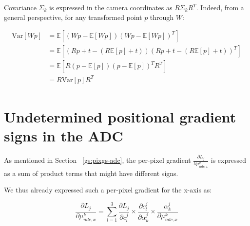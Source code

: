 Covariance $\Sigma_{k}$ is expressed in the camera coordinates as $R\Sigma_{k}R^{T}$. Indeed, from a general perspective, for any transformed point $p$ through $W$: 

\begin{equation}
    \begin{aligned}
    \text{Var}[Wp] &= \mathbb{E}[(Wp - \mathbb{E}[Wp])(Wp - \mathbb{E}[Wp])^T] \\
    &= \mathbb{E}[(Rp+t - (R\mathbb{E}[p]+t))(Rp+t - (R\mathbb{E}[p]+t))^T] \\
    &= \mathbb{E}[R(p - \mathbb{E}[p])(p - \mathbb{E}[p])^T R^T] \\
    &= R\text{Var}[p]R^T \\
    \end{aligned}
    \end{equation}

\section{Undetermined positional gradient signs in the ADC}
\label{appendix:sign-gradient}

As mentioned in Section ~\ref{gs:pixgs-adc}, the per-pixel gradient $\frac{\partial L_{j}}{\partial \mu^{k}_{ndc,x}}$ is expressed as a sum of product terms that might have different signs. 

We thus already expressed such a per-pixel gradient for the x-axis as: 

\begin{equation}
    \label{eq:perpix-grad}
    \frac{\partial L_{j}}{\partial \mu^{k}_{ndc,x}} = \sum \limits_{l=1}^{3} \frac{\partial L_{j}}{\partial c_{l}^{j}}\times \frac{\partial c_{l}^{j}}{\partial \alpha_{k}^{j}} \times \frac{\alpha_{k}^{j}}{\partial \mu^{k}_{ndc,x} }
    \end{equation}

